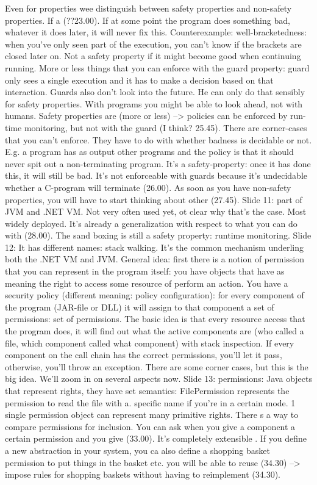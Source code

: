 \documentclass[10pt,a4paper]{report}
\begin{document}
Even for properties wee distinguish between safety properties and non-safety properties. If a (??23.00). If at some point the program does something bad, whatever it does later, it will never fix this.
Counterexample: well-bracketedness: when you've only seen part of the execution, you can't know if the brackets are closed later on. Not a safety property if it might become good when continuing running.
More or less things that you can enforce with the guard property: guard only sees a single execution and it has to make a decision based on that interaction. Guards also don't look into the future. He can only do that sensibly for safety properties. 
With programs you might be able to look ahead, not with humans.
Safety properties are (more or less) --> policies can be enforced by run-time monitoring, but not with the guard (I think? 25.45). There are corner-cases that you can't enforce. They have to do with whether badness is decidable or not. E.g. a program has as output other programs and the policy is that it should never spit out a non-terminating program. It's a safety-property: once it has done this, it will still be bad. It's not enforceable with guards because it's undecidable whether a C-program will terminate (26.00).
As soon as you have non-safety properties, you will have to start thinking about other (27.45).
Slide 11: part of JVM and .NET VM. Not very often used yet, ot clear why that's the case. Most widely deployed. It's already a generalization with respect to what you can do with (28.00).
The sand boxing is still a safety property: runtime monitoring. 
Slide 12: It has different names: stack walking. It's the common mechanism underling both the .NET VM and JVM. 
General idea: first there is a notion of permission that you can represent in the program itself: you have objects that have as meaning the right to access some resource of perform an action. You have a security policy (different meaning: policy configuration): for every component of the program (JAR-file or DLL) it will assign to that component a set of permissions: set of permissions.
The basic idea is that every resource access that the program does, it will find out what the active components are (who called a file, which component called what component) with stack inspection. If every component on the call chain has the correct permissions, you'll let it pass, otherwise, you'll throw an exception.
There are some corner cases, but this is the big idea. We'll zoom in on several aspects now.
Slide 13: permissions: Java objects that represent rights, they have set semantics: FilePermission represents the permission to read the file with a. specific name if you're in a certain mode. 1 single permission object can represent many primitive rights. There s a way to compare permissions for inclusion. You can ask when you give a component a certain permission and you give (33.00). It's completely extensible . If you define a new abstraction in your system, you ca also define a shopping basket permission to put things in the basket etc. you will be able to reuse (34.30) --> impose rules for shopping baskets without having to reimplement (34.30).
\end{document}
